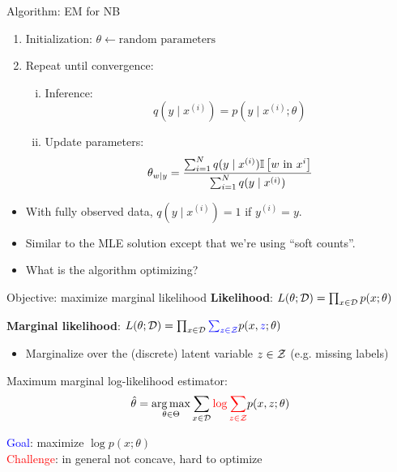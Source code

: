 \documentclass[usenames,dvipsnames,notes]{beamer}
\begin{document}
\begin{frame}
    {Algorithm: EM for NB}
    \begin{enumerate}
        \item Initialization: $\theta \leftarrow \text{random parameters}$
        \item Repeat until convergence:
            \begin{enumerate}[(i)]
                \item Inference: $$
                    q(y\mid x^{(i)}) = p(y\mid x^{(i)};\theta)$$
                \item Update parameters: $$
                    \theta_{w\mid y} = \frac{\sum_{i=1}^N q(y\mid x^{(i)}) \mathbb{I}\left[ w \text{ in } x^{i} \right]}
                    {\sum_{i=1}^N q(y\mid x^{(i)})}
                    $$
            \end{enumerate}
    \end{enumerate}
    \begin{itemize}
        \item With fully observed data, $q(y\mid x^{(i)}) = 1$ if $y^{(i)} = y$.
        \item Similar to the MLE solution except that we're using ``soft counts''.
        \item What is the algorithm optimizing?
    \end{itemize}
\end{frame}

\begin{frame}
    {Objective: maximize marginal likelihood}
    \textbf{Likelihood}: $L(\theta;\mathcal{D}) = \prod_{x\in\mathcal{D}} p(x;\theta)$

    \textbf{Marginal likelihood}: $L(\theta;\mathcal{D}) = \prod_{x\in\mathcal{D}} {\color{blue}\sum_{z\in\mathcal{Z}}}p(x,{\color{blue}z};\theta)$\\
    \begin{itemize}
        \item Marginalize over the (discrete) latent variable $z\in\mathcal{Z}$ (e.g. missing labels)
    \end{itemize}

    Maximum marginal log-likelihood estimator:
    $$
    \hat{\theta} = \operatorname*{arg\,max}_{\theta\in\Theta} \sum_{x\in\mathcal{D}} {\color{red}\log \sum_{z\in\mathcal{Z}}} p(x,z;\theta)
    $$

    \textcolor{blue}{Goal}: maximize $\log p(x;\theta)$\\
    \textcolor{red}{Challenge}: in general not concave, hard to optimize
\end{frame}
\end{document}
